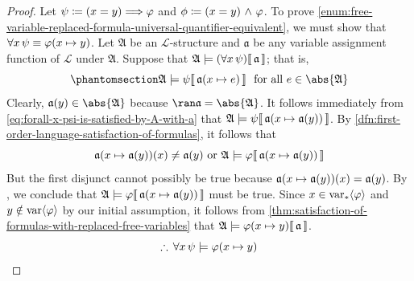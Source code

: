 \begin{proof}
    Let \( \psi \coloneq \mleft( x = y \mright) {\implies} \varphi \) and \( \phi \coloneq \mleft( x = y \mright) \,\,{\land}\,\, \varphi \).
    To prove \ref{enum:free-variable-replaced-formula-universal-quantifier-equivalent}, we must show that \( \forall x \, \psi \equiv \folfreevariablereplacement{\varphi}{x}{y} \).
    Let \( \mathfrak{A} \) be an \( \mathcal{L} \)-structure and \( \mathfrak{a} \) be any variable assignment function of \( \mathcal{L} \) under \( \mathfrak{A} \).
    Suppose that \( \folwffsatisfaction{\mathfrak{A}}{\mleft( \forall x \, \psi \mright)}{\mathfrak{a}} \); that is,
    \begin{equation}
        \phantomsection \label{eq:forall-x-psi-is-satisfied-by-A-with-a}
        \folwffsatisfaction{\mathfrak{A}}{\psi}{ \folmodifiedvariableassignmentfunction{\mathfrak{a}}{x}{e} }
        \ \ \text{for all} \ e \in \abs{\mathfrak{A}}
    \end{equation}
    Clearly, \( \mathfrak{a}(y) \in \abs{\mathfrak{A}} \) because \( \ran \mathfrak{a} = \abs{\mathfrak{A}} \).
    It follows immediately from \eqref{eq:forall-x-psi-is-satisfied-by-A-with-a} that
    \( \folwffsatisfaction{\mathfrak{A}}{\psi}{ \folmodifiedvariableassignmentfunction{\mathfrak{a}}{x}{\mathfrak{a}(y)} } \).
    By \cref{dfn:first-order-language-satisfaction-of-formulas}, it follows that
    \begin{equation*}
        \folmodifiedvariableassignmentfunction{\mathfrak{a}}{x}{\mathfrak{a}(y)}(x) \neq \mathfrak{a}(y) \ \text{or}
        \ \folwffsatisfaction{\mathfrak{A}}{\varphi}{ \folmodifiedvariableassignmentfunction{\mathfrak{a}}{x}{\mathfrak{a}(y)} }
    \end{equation*}
    But the first disjunct cannot possibly be true because \( \folmodifiedvariableassignmentfunction{\mathfrak{a}}{x}{\mathfrak{a}(y)}(x) = \mathfrak{a}(y) \).
    By , we conclude that \( \folwffsatisfaction{\mathfrak{A}}{\varphi}{ \folmodifiedvariableassignmentfunction{\mathfrak{a}}{x}{\mathfrak{a}(y)} } \) must be true.
    Since \( x \in \operatorname{var}_{\ast} \langle\varphi\rangle \) and \( y \notin \operatorname{var} \langle\varphi\rangle \) by our initial assumption,
    it follows from \cref{thm:satisfaction-of-formulas-with-replaced-free-variables} that
    \( \folwffsatisfaction{\mathfrak{A}}{ \folfreevariablereplacement{\varphi}{x}{y} }{\mathfrak{a}} \).
    \begin{equation*}
        \therefore \, \forall x \, \psi \models \folfreevariablereplacement{\varphi}{x}{y}

\end{equation*}
\end{proof}
